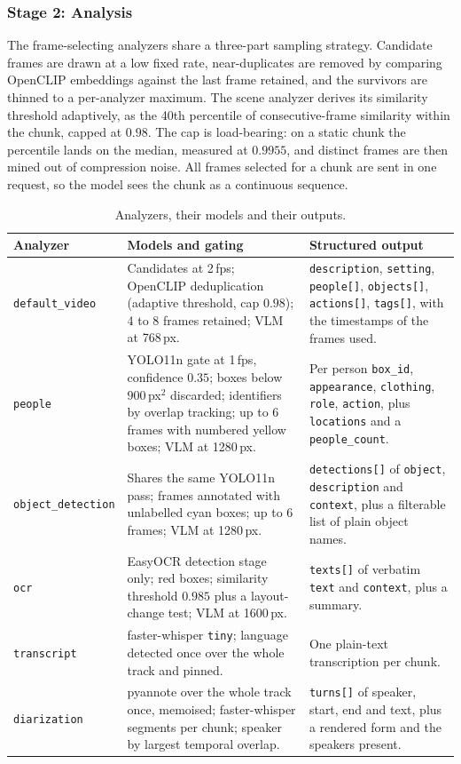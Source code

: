 \documentclass[11pt,a4paper]{article}
\begin{document}
\subsubsection*{Stage 2: Analysis}

The frame-selecting analyzers share a three-part sampling strategy. Candidate
frames are drawn at a low fixed rate, near-duplicates are removed by comparing
OpenCLIP embeddings against the last frame retained, and the survivors are
thinned to a per-analyzer maximum. The scene analyzer derives its similarity
threshold adaptively, as the 40th percentile of consecutive-frame similarity
within the chunk, capped at $0.98$. The cap is load-bearing: on a static chunk
the percentile lands on the median, measured at $0.9955$, and distinct frames
are then mined out of compression noise. All frames selected for a chunk are
sent in one request, so the model sees the chunk as a continuous sequence.

\begin{table}[htbp]
\centering
\small
\begin{tabularx}{\textwidth}{@{}L{2.1cm}L{3.3cm}X@{}}
\toprule
\textbf{Analyzer} & \textbf{Models and gating} & \textbf{Structured output} \\
\midrule
\texttt{default\_video} & Candidates at 2\,fps; OpenCLIP deduplication (adaptive
threshold, cap $0.98$); 4 to 8 frames retained; VLM at 768\,px. &
\texttt{description}, \texttt{setting}, \texttt{people[]}, \texttt{objects[]},
\texttt{actions[]}, \texttt{tags[]}, with the timestamps of the frames used. \\
\texttt{people} & YOLO11n gate at 1\,fps, confidence $0.35$; boxes below
$900$\,px$^2$ discarded; identifiers by overlap tracking; up to 6 frames with
numbered yellow boxes; VLM at 1280\,px. & Per person \texttt{box\_id},
\texttt{appearance}, \texttt{clothing}, \texttt{role}, \texttt{action}, plus
\texttt{locations} and a \texttt{people\_count}. \\
\texttt{object\_\allowbreak detection} & Shares the same YOLO11n pass; frames
annotated with unlabelled cyan boxes; up to 6 frames; VLM at 1280\,px. &
\texttt{detections[]} of \texttt{object}, \texttt{description} and
\texttt{context}, plus a filterable list of plain object names. \\
\texttt{ocr} & EasyOCR detection stage only; red boxes; similarity threshold
$0.985$ plus a layout-change test; VLM at 1600\,px. & \texttt{texts[]} of
verbatim \texttt{text} and \texttt{context}, plus a summary. \\
\texttt{transcript} & faster-whisper \texttt{tiny}; language detected once over
the whole track and pinned. & One plain-text transcription per chunk. \\
\texttt{diarization} & pyannote over the whole track once, memoised;
faster-whisper segments per chunk; speaker by largest temporal overlap. &
\texttt{turns[]} of speaker, start, end and text, plus a rendered form and the
speakers present. \\
\bottomrule
\end{tabularx}
\caption{Analyzers, their models and their outputs.}
\end{table}
\end{document}
